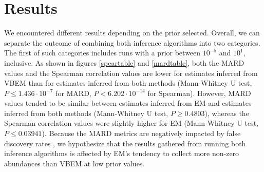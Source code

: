 \section{Results}
We encountered different results depending on the prior selected. Overall, we can separate the outcome of combining both inference algorithms into two categories. The first of such categories includes runs with a prior between $10^{-5}$ and $10^1$, inclusive. As shown in figures \ref{speartable} and \ref{mardtable}, both the $\mathrm{MARD}$ values and the Spearman correlation values are lower for estimates inferred from VBEM than for estimates inferred from both methods (Mann-Whitney U test, $P\leq 1.436 \cdot  10^{-7}$ for MARD, $P < 6.202\cdot 10^{-14}$ for Spearman). However, MARD values tended to be similar between estimates inferred from EM and estimates inferred from both methods (Mann-Whitney U test, $P\geq 0.4803$), whereas the Spearman correlation values were slightly higher for EM (Mann-Whitney U test, $P\leq 0.03941$). Because the MARD metrics are negatively impacted by false discovery rates \cite{patro_salmon_2017}, we hypothesize that the results gathered from running both inference algorithms is affected by EM’s tendency to collect more non-zero abundances than VBEM at low prior values. 

